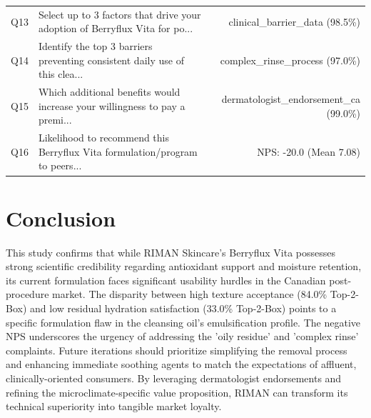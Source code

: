 \documentclass[10pt,twocolumn,a4paper]{article}
\begin{document}
\begin{table}[t]
\begin{tabularx}{\textwidth}{l X r}
Q13 & Select up to 3 factors that drive your adoption of Berryflux Vita for po... & clinical\_barrier\_data (98.5\%) \\
Q14 & Identify the top 3 barriers preventing consistent daily use of this clea... & complex\_rinse\_process (97.0\%) \\
Q15 & Which additional benefits would increase your willingness to pay a premi... & dermatologist\_endorsement\_ca (99.0\%) \\
Q16 & Likelihood to recommend this Berryflux Vita formulation/program to peers... & NPS: -20.0 (Mean 7.08) \\
\bottomrule
\end{tabularx}
\end{table}

\section{Conclusion}
This study confirms that while RIMAN Skincare's Berryflux Vita possesses strong scientific credibility regarding antioxidant support and moisture retention, its current formulation faces significant usability hurdles in the Canadian post-procedure market. The disparity between high texture acceptance (84.0\% Top-2-Box) and low residual hydration satisfaction (33.0\% Top-2-Box) points to a specific formulation flaw in the cleansing oil's emulsification profile. The negative NPS underscores the urgency of addressing the 'oily residue' and 'complex rinse' complaints. Future iterations should prioritize simplifying the removal process and enhancing immediate soothing agents to match the expectations of affluent, clinically-oriented consumers. By leveraging dermatologist endorsements and refining the microclimate-specific value proposition, RIMAN can transform its technical superiority into tangible market loyalty.
\end{document}
